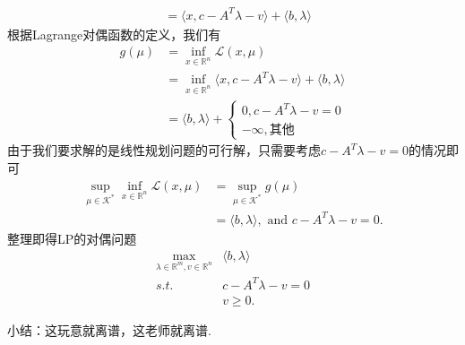 \begin{example}
\begin{equation*}
\begin{split}
				& = \langle x, c- A^T\lambda -v\rangle + \langle b, \lambda \rangle
		\end{split}
	\end{equation*}
	根据Lagrange对偶函数的定义，我们有
	\begin{equation*}
		\begin{split}
			g(\mu) &= \inf\limits_{x\in\mathbb{R}^n} \mathcal{L}(x,\mu)\\
			& = \inf\limits_{x\in\mathbb{R}^n} \langle x, c- A^T\lambda -v\rangle + \langle b, \lambda \rangle\\
			& = \langle b, \lambda \rangle + \begin{cases}
				0, c- A^T\lambda -v = 0\\
				-\infty, \text{其他}
			\end{cases}
		\end{split}
	\end{equation*}
	由于我们要求解的是线性规划问题的可行解，只需要考虑$c- A^T\lambda -v = 0$的情况即可
	\begin{equation*}
		\begin{split}
			\sup\limits_{\mu\in \mathcal{K}^*} \inf\limits_{x\in\mathbb{R}^n} \mathcal{L}(x, \mu) &= \sup\limits_{\mu\in \mathcal{K}^*} g(\mu)\\
			&= \langle b, \lambda\rangle,\text{ and } c-A^T\lambda - v = 0.
		\end{split}
	\end{equation*}
	整理即得LP的对偶问题
	\begin{equation*}
		\begin{split}
			\max\limits_{\lambda\in\mathbb{R}^m, v\in\mathbb{R}^n} & \langle b, \lambda\rangle\\
			s.t.\quad &c-A^T\lambda - v = 0\\
			& v\geq 0.
		\end{split}
	\end{equation*}
\end{example}
\begin{note}
	小结：这玩意就离谱，这老师就离谱.	
\end{note}
